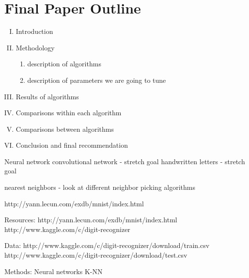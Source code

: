 \documentclass[11pt,a4paper]{article}
\begin{document}
\section*{Final Paper Outline}
\begin{enumerate}[I.]
\item Introduction
\item Methodology
\begin{enumerate}
\item description of algorithms
\item description of parameters we are going to tune
\end{enumerate}
\item Results of algorithms
\item Comparisons within each algorithm
\item Comparisons between algorithms
\item Conclusion and final recommendation
\end{enumerate}


Neural network
	convolutional network - stretch goal
	handwritten letters - stretch goal

nearest neighbors - look at different neighbor picking algorithms

http://yann.lecun.com/exdb/mnist/index.html

Resources: http://yann.lecun.com/exdb/mnist/index.html
http://www.kaggle.com/c/digit-recognizer 

Data: http://www.kaggle.com/c/digit-recognizer/download/train.csv
http://www.kaggle.com/c/digit-recognizer/download/test.csv

Methods: 
Neural networks
K-NN
\end{document}
